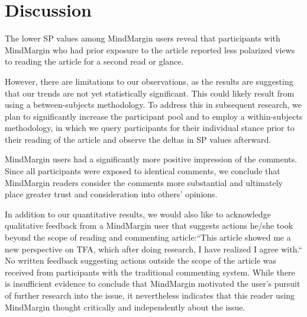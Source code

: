 \section{Discussion}
The lower SP values among MindMargin users reveal that participants with MindMargin who had prior exposure to the article reported less polarized views to reading the article for a second read or glance. 

However, there are limitations to our observations, as the results are suggesting that our trends are not yet statistically significant. This could likely result from using a between-subjects methodology. To address this in subsequent research, we plan to significantly increase the participant pool and to employ a within-subjects methodology, in which we query participants for their individual stance prior to their reading of the article and observe the deltas in SP values afterward. 

MindMargin users had a significantly more positive impression of the comments. Since all participants were exposed to identical comments, we conclude that MindMargin readers consider the comments more substantial and ultimately place greater trust and consideration into others' opinions.

In addition to our quantitative results, we would also like to acknowledge qualitative feedback from a MindMargin user that suggests actions he/she took beyond the scope of reading and commenting article:``This article showed me a new perspective on TFA, which after doing research, I have realized I agree with.`` No written feedback suggesting actions outside the scope of the article was received from participants with the traditional commenting system. While there is insufficient evidence to conclude that MindMargin motivated the user's pursuit of further research into the issue, it nevertheless indicates that this reader using MindMargin thought critically and independently about the issue.